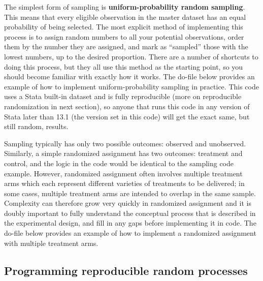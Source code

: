 The simplest form of sampling is
\textbf{uniform-probability random sampling}.
This means that every eligible observation in the master dataset
has an equal probability of being selected.
The most explicit method of implementing this process
is to assign random numbers to all your potential observations,
order them by the number they are assigned,
and mark as ``sampled'' those with the lowest numbers, up to the desired proportion.
There are a number of shortcuts to doing this process,
but they all use this method as the starting point,
so you should become familiar with exactly how it works.
The do-file below provides an example of
how to implement uniform-probability sampling in practice.
This code uses a Stata built-in dataset and is fully reproducible
(more on reproducible randomization in next section),
so anyone that runs this code in any version of Stata later than 13.1
(the version set in this code)
will get the exact same, but still random, results.


Sampling typically has only two possible outcomes: observed and unobserved.
Similarly, a simple randomized assignment has two outcomes: treatment and control,
and the logic in the code would be identical to the sampling code example.
However, randomized assignment often involves multiple treatment arms
which each represent different varieties of treatments to be delivered;
in some cases, multiple treatment arms are intended to overlap in the same sample.
Complexity can therefore grow very quickly in randomized assignment
and it is doubly important to fully understand the conceptual process
that is described in the experimental design,
and fill in any gaps before implementing it in code.
The do-file below provides an example of how to implement
a randomized assignment with multiple treatment arms.



\subsection{Programming reproducible random processes}

